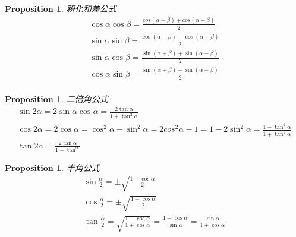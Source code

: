 \documentclass{article}
\newtheorem{proposition}[theorem]{Proposition}
\begin{document}
\begin{proposition}
\rm 积化和差公式
$$
\begin{array}{ll}
\cos\alpha \cos\beta = \frac{cos(\alpha+\beta)+cos(\alpha-\beta)}{2} \\
\sin\alpha \sin\beta = \frac{\cos(\alpha-\beta)-\cos(\alpha+\beta)}{2} \\ 
\sin\alpha \cos\beta = \frac{\sin(\alpha+\beta)+\sin(\alpha-\beta)}{2} \\
\cos\alpha \sin\beta = \frac{\sin(\alpha+\beta)-\sin(\alpha-\beta)}{2} \\ 
\end{array}
$$
\end{proposition}

\begin{proposition}
\rm 二倍角公式
$$
\begin{array}{ll}
\sin 2\alpha = 2\sin \alpha \cos \alpha = \frac{2\tan \alpha}{1 + \tan^2 \alpha}\\
\cos 2\alpha = 2\cos \alpha = \cos^2 \alpha - \sin^2 \alpha =  2cos^2\alpha - 1 = 1 - 2\sin^2 \alpha  = \frac{1-\tan^2 \alpha}{1 + \tan^2\alpha}\\
\tan 2\alpha = \frac{2\tan\alpha}{1-\tan^\alpha}
\end{array}
$$
\end{proposition}

\begin{proposition}
\rm 半角公式
$$
\begin{array}{ll}
\sin\frac{\alpha}{2} = \pm \sqrt{\frac{1-\cos \alpha}{2}} \\
\cos\frac{\alpha}{2} = \pm \sqrt{\frac{1+\cos \alpha}{2}} \\
\tan\frac{\alpha}{2} = \sqrt{\frac{1-\cos \alpha}{1+\cos \alpha}} = \frac{1+\cos \alpha}{\sin \alpha} = \frac{\sin \alpha}{1+\cos \alpha}\\
\end{array}
$$
\end{proposition}
\end{document}
